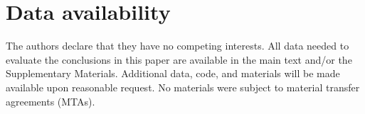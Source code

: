 \documentclass{article}
\begin{document}
\section*{Data availability}
The authors declare that they have no competing interests. All data needed to evaluate the conclusions in this paper are available in the main text and/or the Supplementary Materials. Additional data, code, and materials will be made available upon reasonable request. No materials were subject to material transfer agreements (MTAs).

\clearpage

\end{document}
